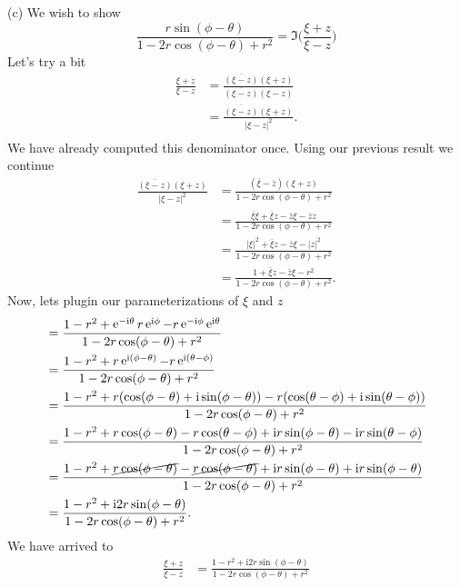 \documentclass[10pt]{amsart}
\newcommand{\I}{\mathrm{i}}
\DeclareMathOperator{\E}{e}
\theoremstyle{nonumberplain}
\begin{document}
\begin{enumerate}[label={\bf {\arabic*}:}]
\noindent
(c) We wish to show
$$
\frac{r\sin(\phi -\theta)}{1 - 2r \cos (\phi-\theta) + r^2} = \Im \bigg(\frac {\xi + z}{\xi - z}\bigg)
$$
Let's try a bit
\begin{align*}
\frac {\xi + z}{\xi - z} &= \frac {\overline{(\xi - z)}(\xi + z)}{\overline{(\xi - z)}(\xi - z)} \\
	&= \frac {\overline{(\xi - z)}(\xi + z)}{|\xi - z|^2}. \\
\end{align*}
We have already computed this denominator once.
Using our previous result we continue
\begin{align*}
\frac {\overline{(\xi - z)}(\xi + z)}{|\xi - z|^2}
	&= \frac {(\bar \xi - \bar z)(\xi + z)}{1 - 2r \cos (\phi - \theta) + r^2} \\
	&= \frac {\bar \xi \xi + \bar \xi z - \bar z \xi - \bar z z}{1 - 2r \cos (\phi - \theta) + r^2} \\
	&= \frac {|\xi|^2 + \bar \xi z - \bar z \xi - |z|^2}{1 - 2r \cos (\phi - \theta) + r^2} \\
	&= \frac {1 + \bar \xi z - \bar z \xi - r^2}{1 - 2r \cos (\phi - \theta) + r^2}.
\end{align*}
Now, lets plugin our parameterizations of $\xi$ and $z$
\begin{align*}
	&= \frac {1 - r^2 + \E^{-\I \theta} r\E^{\I \phi} - r\E^{-\I \phi} \E^{\I \theta}}{1 - 2r \cos (\phi - \theta) + r^2} \\
	&= \frac {1 - r^2 + r\E^{\I (\phi - \theta)} - r\E^{\I(\theta - \phi)}}{1 - 2r \cos (\phi - \theta) + r^2} \\
	&= \frac {1 - r^2 + r(\cos(\phi - \theta) + \I \sin(\phi - \theta)) - r(\cos(\theta - \phi) + \I \sin(\theta - \phi))}{1 - 2r \cos (\phi - \theta) + r^2} \\
	&= \frac {1 - r^2 + r\cos(\phi - \theta) - r\cos(\theta - \phi) + \I r\sin(\phi - \theta) - \I r\sin(\theta - \phi)}{1 - 2r \cos (\phi - \theta) + r^2} \\
	&= \frac {1 - r^2 + \cancel{r\cos(\phi - \theta)} - \cancel{r\cos(\phi - \theta)} + \I r\sin(\phi - \theta) + \I r\sin(\phi - \theta)}{1 - 2r \cos (\phi - \theta) + r^2} \\
	&= \frac {1 - r^2 + \I 2 r\sin(\phi - \theta)}{1 - 2r \cos (\phi - \theta) + r^2}.
\end{align*}
We have arrived to 
\begin{align*}
\frac {\xi + z}{\xi - z} &= \frac {1 - r^2 + \I 2 r\sin(\phi - \theta)}{1 - 2r \cos (\phi - \theta) + r^2} \\

\end{align*}
\end{enumerate}
\end{document}
